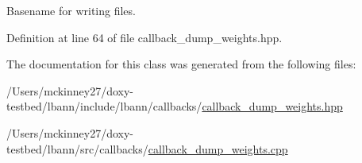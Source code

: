 Basename for writing files. 

Definition at line 64 of file callback\+\_\+dump\+\_\+weights.\+hpp.



The documentation for this class was generated from the following files\+:\begin{DoxyCompactItemize}
\item 
/\+Users/mckinney27/doxy-\/testbed/lbann/include/lbann/callbacks/\hyperlink{callback__dump__weights_8hpp}{callback\+\_\+dump\+\_\+weights.\+hpp}\item 
/\+Users/mckinney27/doxy-\/testbed/lbann/src/callbacks/\hyperlink{callback__dump__weights_8cpp}{callback\+\_\+dump\+\_\+weights.\+cpp}\end{DoxyCompactItemize}
